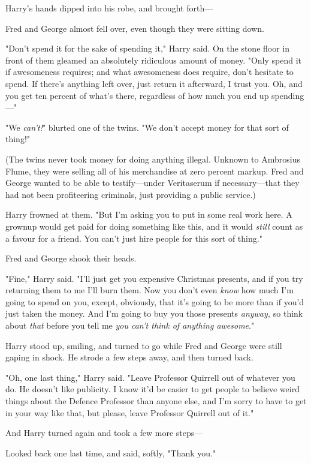 Harry's hands dipped into his robe, and brought forth---

Fred and George almost fell over, even though they were sitting down.

"Don't spend it for the sake of spending it," Harry said. On the stone floor in
front of them gleamed an absolutely ridiculous amount of money. "Only spend it
if awesomeness requires; and what awesomeness does require, don't hesitate to
spend. If there's anything left over, just return it afterward, I trust you.
Oh, and you get ten percent of what's there, regardless of how much you end up
spending---"

"We \emph{can't!}" blurted one of the twins. "We don't accept money for that
sort of thing!"

(The twins never took money for doing anything illegal. Unknown to Ambrosius
Flume, they were selling all of his merchandise at zero percent markup. Fred
and George wanted to be able to testify---under Veritaserum if necessary---that
they had not been profiteering criminals, just providing a public service.)

Harry frowned at them. "But I'm asking you to put in some real work here. A
grownup would get paid for doing something like this, and it would \emph{still}
count as a favour for a friend. You can't just hire people for this sort of
thing."

Fred and George shook their heads.

"Fine," Harry said. "I'll just get you expensive Christmas presents, and if you
try returning them to me I'll burn them. Now you don't even \emph{know} how
much I'm going to spend on you, except, obviously, that it's going to be more
than if you'd just taken the money. And I'm going to buy you those presents
\emph{anyway,} so think about \emph{that} before you tell me \emph{you can't
think of anything awesome}."

Harry stood up, smiling, and turned to go while Fred and George were still
gaping in shock. He strode a few steps away, and then turned back.

"Oh, one last thing," Harry said. "Leave Professor Quirrell out of whatever you
do. He doesn't like publicity. I know it'd be easier to get people to believe
weird things about the Defence Professor than anyone else, and I'm sorry to
have to get in your way like that, but please, leave Professor Quirrell out of
it."

And Harry turned again and took a few more steps---

Looked back one last time, and said, softly, "Thank you."

